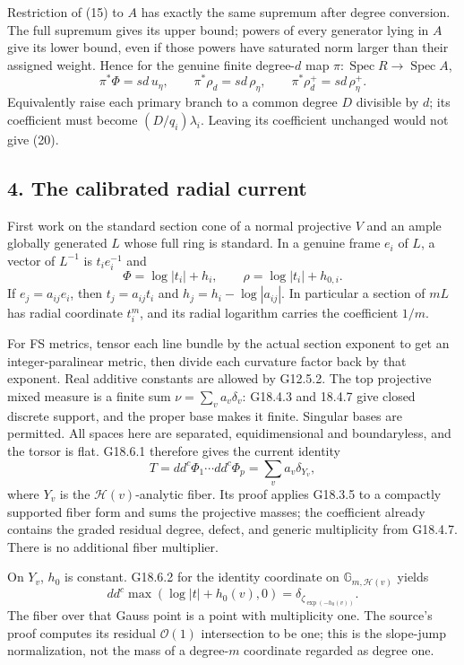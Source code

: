 \documentclass[
  10pt,
]{article}
\begin{document}
Restriction of (15) to \(A\) has exactly the same supremum after degree
conversion. The full supremum gives its upper bound; powers of every
generator lying in \(A\) give its lower bound, even if those powers have
saturated norm larger than their assigned weight. Hence for the genuine
finite degree-\(d\) map
\(\pi:\operatorname{Spec}R\to\operatorname{Spec}A\),
\[ \pi^*\Phi=sd\,u_\eta,\qquad \pi^*\rho_d=sd\,\rho_\eta,\qquad\pi^*\rho_d^+=sd\,\rho_\eta^+.       \tag{20}\]
Equivalently raise each primary branch to a common degree \(D\)
divisible by \(d\); its coefficient must become \((D/q_i)\lambda_i\).
Leaving its coefficient unchanged would not give (20).

\subsection{4. The calibrated radial
current}\label{the-calibrated-radial-current}

First work on the standard section cone of a normal projective \(V\) and
an ample globally generated \(L\) whose full ring is standard. In a
genuine frame \(e_i\) of \(L\), a vector of \(L^{-1}\) is
\(t_i e_i^{-1}\) and
\[ \Phi=\log|t_i|+h_i,\qquad\rho=\log|t_i|+h_{0,i}.                                            \tag{21}\]
If \(e_j=a_{ij}e_i\), then \(t_j=a_{ij}t_i\) and
\(h_j=h_i-\log|a_{ij}|\). In particular a section of \(mL\) has radial
coordinate \(t_i^m\), and its radial logarithm carries the coefficient
\(1/m\).

For FS metrics, tensor each line bundle by the actual section exponent
to get an integer-paralinear metric, then divide each curvature factor
back by that exponent. Real additive constants are allowed by G12.5.2.
The top projective mixed measure is a finite sum
\(\nu=\sum_v a_v\delta_v\): G18.4.3 and 18.4.7 give closed discrete
support, and the proper base makes it finite. Singular bases are
permitted. All spaces here are separated, equidimensional and
boundaryless, and the torsor is flat. G18.6.1 therefore gives the
current identity
\[ T=dd^c\Phi_1\cdots dd^c\Phi_p=\sum_v a_v\delta_{Y_v},                                    \tag{22}\]
where \(Y_v\) is the \(\mathcal H(v)\)-analytic fiber. Its proof applies
G18.3.5 to a compactly supported fiber form and sums the projective
masses; the coefficient already contains the graded residual degree,
defect, and generic multiplicity from G18.4.7. There is no additional
fiber multiplier.

On \(Y_v\), \(h_0\) is constant. G18.6.2 for the identity coordinate on
\(\mathbb G_{m,\mathcal H(v)}\) yields
\[ dd^c\max(\log|t|+h_0(v),0)=\delta_{\zeta_{\exp(-h_0(v))}}.                                 \tag{23}\]
The fiber over that Gauss point is a point with multiplicity one. The
source's proof computes its residual \(\mathcal O(1)\) intersection to
be one; this is the slope-jump normalization, not the mass of a
degree-\(m\) coordinate regarded as degree one.
\end{document}
